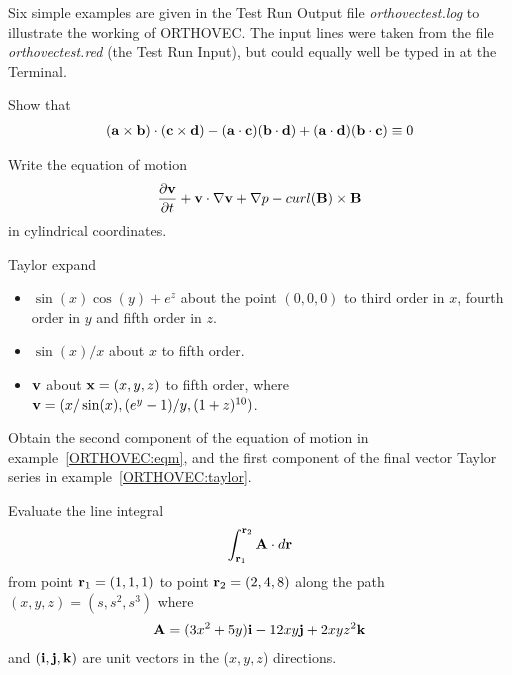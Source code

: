 Six  simple examples are given in the Test Run Output file 
{\em orthovectest.log} to illustrate the working of ORTHOVEC.  
The input lines were taken from the file
{\em orthovectest.red} (the Test Run Input), but could 
equally well be typed in at the Terminal.

\example{}

Show that
\begin{eqnarray*}
({\bf a}  \times {\bf b}) \cdot ({\bf c} \times {\bf d}) - ({\bf a} 
\cdot {\bf c})({\bf b} \cdot {\bf d})
 + ({\bf a} \cdot {\bf d})({\bf b} \cdot {\bf c}) \equiv 0
\end{eqnarray*}
 
\example{}\label{ORTHOVEC:eqm}

Write the equation of motion
\begin{eqnarray*}
\frac{\partial {\bf v}}{\partial t} + {\bf v} \cdot {\bf \nabla v} 
+ {\bf \nabla} p - curl ({\bf B}) \times {\bf B}
\end{eqnarray*}
in cylindrical coordinates.

\example{}\label{ORTHOVEC:taylor}

Taylor expand
\begin{itemize}
\item $\sin(x) \cos(y) +e^z$
about the point $(0,0,0)$ to third order in $x$, fourth order in $y$ and
fifth order in $z$.

\item $\sin(x)/x$ about $x$ to fifth order.

\item ${\bf v}$ about ${\bf x}=(x,y,z)$ to fifth order, where
${\bf v} = (x/ \sin(x),(e^y-1)/y,(1+z)^{10})$.
\end{itemize}

\example{}

Obtain the second component of the equation of motion in
example~\ref{ORTHOVEC:eqm}, and the first component of the final
vector Taylor series in example~\ref{ORTHOVEC:taylor}.

\example{}

Evaluate the line integral 
\begin{eqnarray*}
\int^{{\bf r}_2}_{{\bf r}_1} {\bf A} \cdot d{\bf r}
\end{eqnarray*}
from point ${\bf r}_1 = (1,1,1)$ to point
${\bf r}_2 = (2,4,8)$ along the path $(x,y,z) = (s, s^2, s^3)$ where\\
\begin{eqnarray*}
{\bf A} = (3x^2 + 5y) {\bf i} - 12xy{\bf j} + 2xyz^2{\bf k}
\end{eqnarray*}
and $({\bf i, j, k})$ are unit vectors in the ($x,y,z$) directions.

